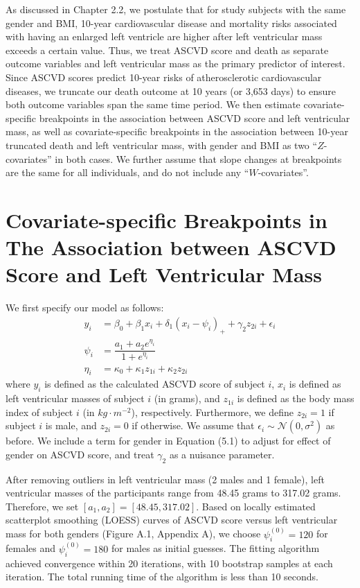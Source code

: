 \documentclass [12pt, proquest] {uwthesis}[2016/11/22]
\begin{document}
As discussed in Chapter 2.2, we postulate that for study subjects with the same gender and BMI, 10-year cardiovascular disease and mortality risks associated with having an enlarged left ventricle are higher after left ventricular mass exceeds a certain value. Thus, we treat ASCVD score and death as separate outcome variables and left ventricular mass as the primary predictor of interest. Since ASCVD scores predict 10-year risks of atherosclerotic cardiovascular diseases, we truncate our death outcome at 10 years (or 3,653 days) to ensure both outcome variables span the same time period. We then estimate covariate-specific breakpoints in the association between ASCVD score and left ventricular mass, as well as covariate-specific breakpoints in the association between 10-year truncated death and left ventricular mass, with gender and BMI as two ``$Z$-covariates'' in both cases. We further assume that slope changes at breakpoints are the same for all individuals, and do not include any ``$W$-covariates''.

\section{Covariate-specific Breakpoints in The Association between ASCVD Score and Left Ventricular Mass}

We first specify our model as follows:
\begin{align}
    y_i &= \beta_0 + \beta_1 x_i  + \delta_1 (x_i - \psi_i)_+ + \gamma_2 z_{2i} + \epsilon_i \\
    \psi_i &= \dfrac{a_1 + a_2 e^{\eta_i}}{1 + e^{\eta_i}} \\
    \eta_i &= \kappa_0 + \kappa_1 z_{1i} + \kappa_2 z_{2i}
\end{align}
where $y_i$ is defined as the calculated ASCVD score of subject $i$, $x_i$ is defined as left ventricular masses of subject $i$ (in grams), and $z_{1i}$ is defined as the body mass index of subject $i$ (in $kg \cdot m^{-2}$), respectively. Furthermore, we define $z_{2i} = 1$ if subject $i$ is male, and $z_{2i} = 0$ if otherwise. We assume that $\epsilon_i \sim \mathcal{N}(0, \sigma^2)$ as before. We include a term for gender in Equation (5.1) to adjust for effect of gender on ASCVD score, and treat $\gamma_2$ as a nuisance parameter. 

After removing outliers in left ventricular mass (2 males and 1 female), left ventricular masses of the participants range from 48.45 grams to 317.02 grams. Therefore, we set $[a_1, a_2] = [48.45, 317.02]$. Based on locally estimated scatterplot smoothing (LOESS) curves of ASCVD score versus left ventricular mass for both genders (Figure A.1, Appendix A), we choose $\psi_i^{(0)} = 120$ for females and $\psi_i^{(0)} = 180$ for males as initial guesses. The fitting algorithm achieved convergence within 20 iterations, with 10 bootstrap samples at each iteration. The total running time of the algorithm is less than 10 seconds.
\end{document}
